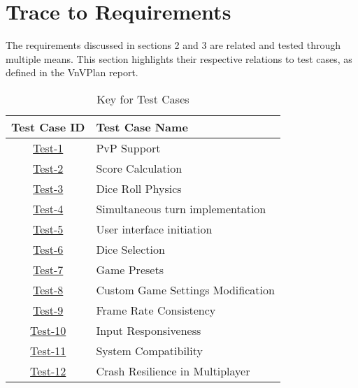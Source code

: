 \documentclass[12pt, titlepage]{article}
\begin{document}
\newpage
\section{Trace to Requirements}

The requirements discussed in sections 2 and 3 are related and tested through multiple means. This section highlights their respective relations to test cases, as defined in the VnVPlan report.

\begin{table}[H]
    \centering
    \caption{Key for Test Cases}
    \begin{tabular}{|c|l|}
        \hline
        \textbf{Test Case ID} & \textbf{Test Case Name} \\
        \hline
        \hyperref[test-1]{Test-1} & PvP Support \\
        \hyperref[test-2]{Test-2} & Score Calculation \\
        \hyperref[test-3]{Test-3} & Dice Roll Physics \\
        \hyperref[test-4]{Test-4} & Simultaneous turn implementation \\
        \hyperref[test-5]{Test-5} & User interface initiation \\
        \hyperref[test-6]{Test-6} & Dice Selection \\
        \hyperref[test-7]{Test-7} & Game Presets \\
        \hyperref[test-8]{Test-8} & Custom Game Settings Modification \\
        \hyperref[test-9]{Test-9} & Frame Rate Consistency \\
        \hyperref[test-10]{Test-10} & Input Responsiveness \\
        \hyperref[test-11]{Test-11} & System Compatibility \\
        \hyperref[test-12]{Test-12} & Crash Resilience in Multiplayer \\
        \hline
    \end{tabular}
    \label{tab:traceability_key1}
\end{table}
\end{document}
